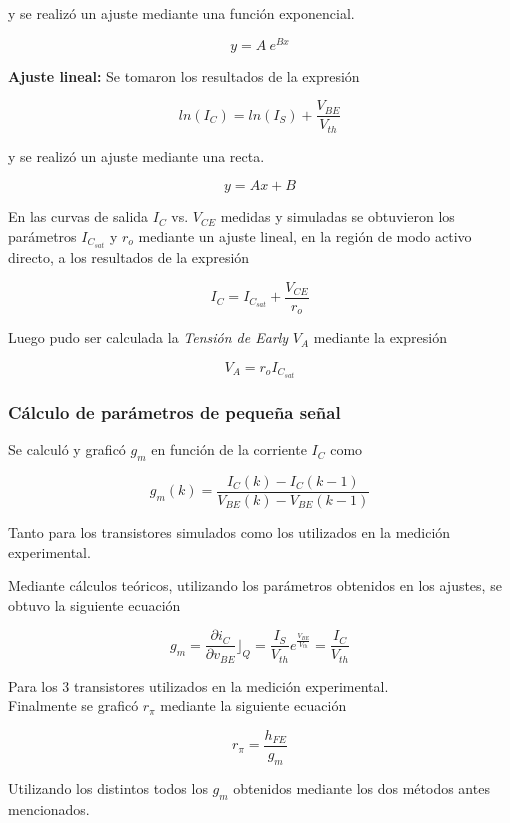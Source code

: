 \documentclass[10pt,spanish,a4paper,openany,notitlepage]{article}
\begin{document}
y se realizó un ajuste mediante una función exponencial.

\[ \displaystyle y  = A\ e^{B x} \]

\textbf{Ajuste lineal:} Se tomaron los resultados de la expresión

\[ \displaystyle ln(I_C)  = ln(I_S) + \frac{V_{BE}}{V_{th}} \]

y se realizó un ajuste mediante una recta.

\[ \displaystyle y  = A x + B \]

En las curvas de salida $I_C$ vs. $V_{CE}$ medidas y simuladas se obtuvieron 
los parámetros $I_{C_{sat}}$ y $r_o$ mediante un ajuste lineal, en la región 
de modo activo directo, a los resultados de la expresión

\[ \displaystyle I_C  = I_{C_{sat}} + \frac{V_{CE}}{r_o} \]

Luego pudo ser calculada la \emph{Tensión de Early} $V_A$ mediante la expresión

\[ \displaystyle V_A = r_o I_{C_{sat}} \]

\subsubsection{Cálculo de parámetros de pequeña señal}

Se calculó y graficó $g_m$ en función de la corriente $I_C$ como

\[ \displaystyle g_m(k) = \frac{I_C(k) - I_C(k-1)}{V_{BE}(k)-V_{BE}(k-1)} \]

Tanto para los transistores simulados como los utilizados en la medición experimental.

Mediante cálculos teóricos, utilizando los parámetros obtenidos en los ajustes, se obtuvo la siguiente ecuación

\[ \displaystyle  g_m = \frac{\displaystyle \partial i_{C}}{\displaystyle \partial v_{BE}}\Bigr\rfloor_Q = \frac{\displaystyle I_S}{\displaystyle V_{th}} e^{\frac{\displaystyle V_{BE}}{\displaystyle V_{th}}} = \frac{\displaystyle I_C}{\displaystyle V_{th}} \]

Para los 3 transistores utilizados en la medición experimental.\\

Finalmente se graficó $r_\pi$ mediante la siguiente ecuación

\[ \displaystyle r_\pi = \frac{h_{FE}}{g_m} \]

Utilizando los distintos todos los $g_m$ obtenidos mediante los dos métodos 
antes mencionados.
\end{document}
